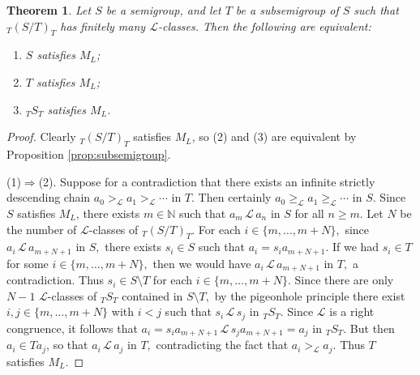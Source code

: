\documentclass[twoside,a4paper,12pt,reqno]{amsart}
\theoremstyle{plain}
\newtheorem{thm}{Theorem}[section]
\theoremstyle{definition}
\renewcommand{\l}{\mbox{${\mathcal{L}}$}}
\newcommand{\geql}{\geq_{\mathcal{L}}}
\newcommand{\gl}{>_{\mathcal{L}}}
\newcommand{\N}{\mathbb{N}}
\newcommand{\sm}{\setminus}
\begin{document}
\begin{thm}\label{thm:subsemigroup}
Let $S$ be a semigroup, and let $T$ be a subsemigroup of $S$ such that ${_T}(S/T)_T$ has finitely many $\l$-classes.  Then the following are equivalent:
\begin{enumerate}[leftmargin=*]
\item[\emph{(1)}] $S$ satisfies $M_L$;
\item[\emph{(2)}] $T$ satisfies $M_L$;
\item[\emph{(3)}] ${_T}S_T$ satisfies $M_L$.
\end{enumerate}
\end{thm}

\begin{proof}
Clearly ${_T}(S/T)_T$ satisfies $M_L$, so (2) and (3) are equivalent by Proposition \ref{prop:subsemigroup}.

(1)$\Rightarrow$(2).  Suppose for a contradiction that there exists an infinite strictly descending chain $a_0\gl a_1\gl\cdots$ in $T.$  Then certainly $a_0\geql a_1\geql\cdots$ in $S.$  Since $S$ satisfies $M_L$, there exists $m\in\N$ such that $a_m\,\l\,a_n$ in $S$ for all $n\geq m.$  Let $N$ be the number of $\l$-classes of ${_T}(S/T)_T$.  For each $i\in\{m,\dots,m+N\},$ since $a_i\,\l\,a_{m+N+1}$ in $S,$ there exists $s_i\in S$ such that $a_i=s_ia_{m+N+1}$.  If we had $s_i\in T$ for some $i\in\{m,\dots,m+N\},$ then we would have $a_i\,\l\,a_{m+N+1}$ in $T,$ a contradiction.  Thus $s_i\in S{\sm}T$ for each $i\in\{m,\dots,m+N\}.$  Since there are only $N-1$ $\l$-classes of ${_T}S_T$ contained in $S{\sm}T,$ by the pigeonhole principle there exist $i,j\in\{m,\dots,m+N\}$ with $i<j$ such that $s_i\,\l\,s_j$ in ${_T}S_T$.  Since $\l$ is a right congruence, it follows that $a_i=s_ia_{m+N+1}\,\l\,s_ja_{m+N+1}=a_j$ in ${_T}S_T$.  But then $a_i\in Ta_j$, so that $a_i\,\l\,a_j$ in $T,$ contradicting the fact that $a_i\gl a_j$.  Thus $T$ satisfies $M_L$.


\end{proof}
\end{document}
